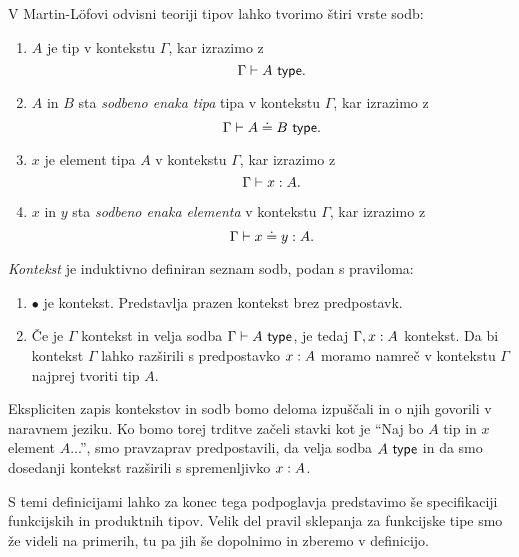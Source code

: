 \begin{definicija}
  V Martin-Löfovi odvisni teoriji tipov lahko tvorimo štiri vrste sodb:
\begin{enumerate}
\item \(A\) je tip v kontekstu \(\Gamma\), kar izrazimo z \[\Gamma \vdash A\ \textnormal{\textsf{type}}.\]
\item \(A\) in \(B\) sta \emph{sodbeno enaka tipa} tipa v kontekstu \(\Gamma\),
  kar izrazimo z \[\Gamma \vdash A \doteq B\ \textnormal{\textsf{type}}.\]
\item \(x\) je element tipa \(A\) v kontekstu \(\Gamma\), kar izrazimo z
  \[\Gamma \vdash x : A.\]
\item \(x\) in \(y\) sta \emph{sodbeno enaka elementa} v kontekstu \(\Gamma\), kar izrazimo z
  \[\Gamma \vdash x \doteq y : A.\]
\end{enumerate}
\emph{Kontekst} je induktivno definiran seznam sodb, podan s praviloma:
\begin{enumerate}
\item \(\bullet\) je kontekst. Predstavlja prazen kontekst brez predpostavk.
\item Če je \(\Gamma\) kontekst in velja sodba \(\Gamma \vdash A\ \textnormal{\textsf{type}}\), je tedaj \(\Gamma, x : A\) kontekst. Da bi kontekst \(\Gamma\) lahko razširili s predpostavko \(x : A\) moramo namreč v kontekstu \(\Gamma\) najprej tvoriti tip \(A\).
\end{enumerate}
\end{definicija}
Ekspliciten zapis kontekstov in sodb bomo deloma izpuščali in o
njih govorili v naravnem jeziku. Ko bomo torej trditve začeli stavki kot je
``Naj bo \(A\) tip in \(x\) element \(A\)...'', smo pravzaprav predpostavili, da velja
sodba \(A\ \textnormal{\textsf{type}}\) in da smo dosedanji kontekst razširili s spremenljivko \(x : A\).

S temi definicijami lahko za konec tega podpoglavja predstavimo še specifikaciji
funkcijskih in produktnih tipov. Velik del pravil sklepanja za funkcijske tipe smo že
videli na primerih, tu pa jih še dopolnimo in zberemo v definicijo.

